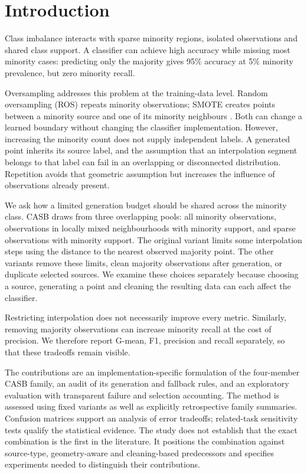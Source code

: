 \documentclass[conference]{IEEEtran}
\begin{document}
\section{Introduction}
Class imbalance interacts with sparse minority regions, isolated observations and shared class support. A classifier can achieve high accuracy while missing most minority cases: predicting only the majority gives 95\% accuracy at 5\% minority prevalence, but zero minority recall.

Oversampling addresses this problem at the training-data level. Random oversampling (ROS) repeats minority observations; SMOTE creates points between a minority source and one of its minority neighbours \citep{chawla2002}. Both can change a learned boundary without changing the classifier implementation. However, increasing the minority count does not supply independent labels. A generated point inherits its source label, and the assumption that an interpolation segment belongs to that label can fail in an overlapping or disconnected distribution. Repetition avoids that geometric assumption but increases the influence of observations already present.

We ask how a limited generation budget should be shared across the minority class. CASB draws from three overlapping pools: all minority observations, observations in locally mixed neighbourhoods with minority support, and sparse observations with minority support. The original variant limits some interpolation steps using the distance to the nearest observed majority point. The other variants remove these limits, clean majority observations after generation, or duplicate selected sources. We examine these choices separately because choosing a source, generating a point and cleaning the resulting data can each affect the classifier.

Restricting interpolation does not necessarily improve every metric. Similarly, removing majority observations can increase minority recall at the cost of precision. We therefore report G-mean, F1, precision and recall separately, so that these tradeoffs remain visible.

The contributions are an implementation-specific formulation of the four-member CASB family, an audit of its generation and fallback rules, and an exploratory evaluation with transparent failure and selection accounting. The method is assessed using fixed variants as well as explicitly retrospective family summaries. Confusion matrices support an analysis of error tradeoffs; related-task sensitivity tests qualify the statistical evidence. The study does not establish that the exact combination is the first in the literature. It positions the combination against source-type, geometry-aware and cleaning-based predecessors and specifies experiments needed to distinguish their contributions.
\end{document}
